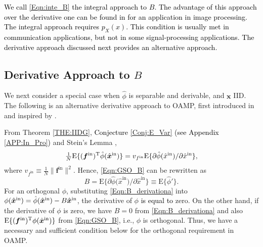 \documentclass[journal]{IEEEtran}
\newcommand{\mr}{\mathrm}
\newcommand{\BE}{\begin{equation}}
\newcommand{\EE}{\end{equation}}
\renewcommand{\bf}{\bm}
\newcommand{\bb}{\mathbb}
\newtheorem{definition}[theorem]{Definition}
\newcommand{\LL}[1]{\textcolor{black}{#1}}
\begin{document}
\LL{We call \eqref{Eqn:inte_B} the integral approach to $B$. The advantage of this approach over the derivative one can be found in \cite{Yiyao_integral} for an application in image processing. 
 The integral approach requires $p_X(x)$. This condition is usually met in communication applications, but not in some signal-processing applications. The derivative approach discussed next provides an alternative approach.}



\subsection{Derivative Approach to \texorpdfstring{$B$}{B}}\label{Sec:B_methods2}
We next consider a special case when $\hat{\phi}$ is separable and derivable, and $\bf{x}$ IID. The following is an alternative derivative approach to OAMP, first introduced in \cite{Ma2016} and  inspired by \cite{Donoho2009}. %
 
 
From Theorem \ref{THE:IIDG}, \LL{Conjecture \ref{Conj:E_Var} (see Appendix \ref{APP:In_Pro})} and Stein’s Lemma \cite{Stein1972},  
\BE \label{Eqn:stein_lemma}
 \tfrac{1}{N}\mr{E}\{ (\bf{f}^{\mr{in}})^{\rm T}\hat{\phi}(\hat{\bf{x}}^{\mr{in}})\} =  v_{f^{\mr{in}}}   \mr{E}\{\partial \hat{\phi}({\hat{x}^{\mr{in}}})/\partial {\hat{x}^{\mr{in}}}\},
\EE
where $v_{f^{\mr{in}}}\equiv\tfrac{1}{N} \|{\bf{f}}^{\mr{in}}\|^2$. Hence, \eqref{Eqn:GSO_B} can be rewritten as
\BE\label{Eqn:B_derivationa}
B=\mr{E}\{{\partial\hat{\phi}({\hat{x}^{\mr{in}})}}/{\partial{\hat{x}^{\mr{in}}}}\}\equiv  \mr{E}\{\hat{ {\phi}}'\}.
\EE 
For an orthogonal $\phi$, substituting \eqref{Eqn:B_derivationa} into $\phi(\hat{\bf{x}}^{\mr{in}})= \hat{\phi}(\hat{\bf{x}}^{\mr{in}})\\-B \hat{\bf{x}}^{\mr{in}}$, the derivative of $\phi$ \LL{is equal to} zero. On the other hand, if the derivative of $\phi$ is zero, we have $B=0$ from \eqref{Eqn:B_derivationa} and also $\mr{E}\{(\bf{f}^{\mr{in}})^{\rm T}\phi(\hat{\bf{x}}^{\mr{in}})\}$ from \eqref{Eqn:GSO_B}, i.e., $\phi$ is orthogonal. Thus, we have a necessary and sufficient condition below for the orthogonal requirement in OAMP. 
\end{document}
